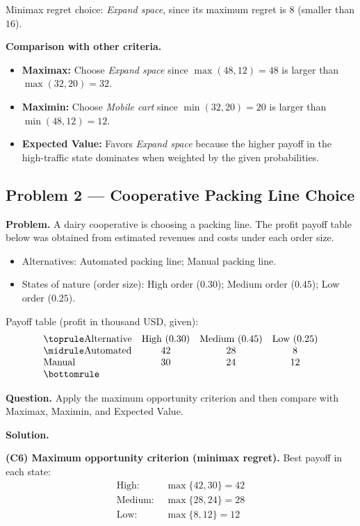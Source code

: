 	Minimax regret choice: \emph{Expand space}, since its maximum regret is $8$ (smaller than $16$).
	
	\textbf{Comparison with other criteria.}
	\begin{itemize}
		\item \textbf{Maximax:} Choose \emph{Expand space} since $\max(48,12)=48$ is larger than $\max(32,20)=32$.
		\item \textbf{Maximin:} Choose \emph{Mobile cart} since $\min(32,20)=20$ is larger than $\min(48,12)=12$.
		\item \textbf{Expected Value:} Favors \emph{Expand space} because the higher payoff in the high-traffic state dominates when weighted by the given probabilities.
	\end{itemize}
	
	\hypertarget{c6-ex2}{}
	\subsection*{Problem 2 — Cooperative Packing Line Choice}
	
	\textbf{Problem.} A dairy cooperative is choosing a packing line. The profit payoff table below was obtained from estimated revenues and costs under each order size.
	
	\begin{itemize}
		\item Alternatives: Automated packing line; Manual packing line.
		\item States of nature (order size): High order ($0.30$); Medium order ($0.45$); Low order ($0.25$).
	\end{itemize}
	
	Payoff table (profit in thousand USD, given):
	\[
	\begin{array}{lccc}
		\toprule
		\text{Alternative} & \text{High }(0.30) & \text{Medium }(0.45) & \text{Low }(0.25)\\
		\midrule
		\text{Automated} & 42 & 28 & 8\\
		\text{Manual} & 30 & 24 & 12\\
		\bottomrule
	\end{array}
	\]
	
	\textbf{Question.} Apply the maximum opportunity criterion and then compare with Maximax, Maximin, and Expected Value.
	
	\textbf{Solution.}
	
	\textbf{(C6) Maximum opportunity criterion (minimax regret).} Best payoff in each state:
	\[
	\begin{aligned}
		\text{High: } &\max\{42, 30\} = 42\\
		\text{Medium: } &\max\{28, 24\} = 28\\
		\text{Low: } &\max\{8, 12\} = 12
	\end{aligned}
	\]
	
